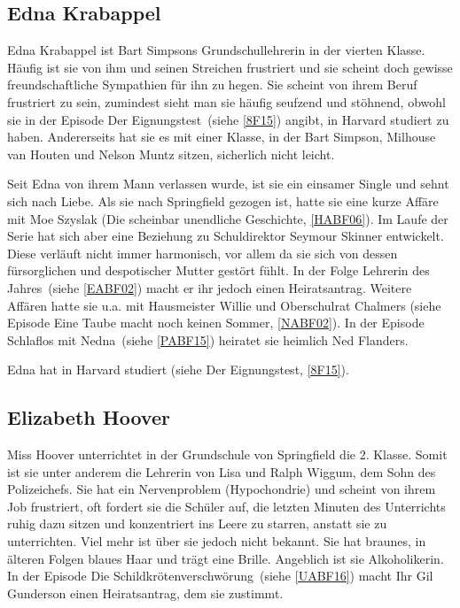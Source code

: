 \subsection{Edna Krabappel}\label{Krabappel}
Edna Krabappel ist Bart Simpsons Grundschullehrerin in der vierten Klasse. Häufig ist sie von ihm und seinen Streichen frustriert und sie scheint doch gewisse freundschaftliche Sympathien für ihn zu hegen. Sie scheint von ihrem Beruf frustriert zu sein, zumindest sieht man sie häufig seufzend und stöhnend, obwohl sie in der Episode \glqq Der Eignungstest\grqq\ (siehe \ref{8F15}) angibt, in Harvard studiert zu haben. Andererseits hat sie es mit einer Klasse, in der Bart Simpson, Milhouse van Houten und Nelson Muntz sitzen, sicherlich nicht leicht.

Seit Edna von ihrem Mann verlassen wurde, ist sie ein einsamer Single und sehnt sich nach Liebe. Als sie nach Springfield gezogen ist, hatte sie eine kurze Affäre mit Moe Szyslak (\glqq Die scheinbar unendliche Geschichte\grqq , \ref{HABF06}). Im Laufe der Serie hat sich aber eine Beziehung zu Schuldirektor Seymour Skinner entwickelt. Diese verläuft nicht immer harmonisch, vor allem da sie sich von dessen fürsorglichen und despotischer Mutter gestört fühlt. In der Folge \glqq Lehrerin des Jahres\grqq\ (siehe \ref{EABF02}) macht er ihr jedoch einen Heiratsantrag. Weitere Affären hatte sie u.a. mit Hausmeister Willie und Oberschulrat Chalmers (siehe Episode \glqq Eine Taube macht noch keinen Sommer\grqq , \ref{NABF02}). In der Episode \glqq Schlaflos mit Nedna\grqq\ (siehe \ref{PABF15}) heiratet sie heimlich Ned Flanders.

Edna hat in Harvard studiert (siehe \glqq Der Eignungstest\grqq, \ref{8F15}).


\subsection{Elizabeth Hoover}\label{ElizabethHoover}
Miss Hoover unterrichtet in der Grundschule von Springfield die 2. Klasse. Somit ist sie unter anderem die Lehrerin von Lisa und Ralph Wiggum, dem Sohn des Polizeichefs. Sie hat ein Nervenproblem (Hypochondrie) und scheint von ihrem Job frustriert, oft fordert sie die Schüler auf, die letzten Minuten des Unterrichts ruhig dazu sitzen und konzentriert ins Leere zu starren, anstatt sie zu unterrichten. Viel mehr ist über sie jedoch nicht bekannt. Sie hat braunes, in älteren Folgen blaues Haar und trägt eine Brille. Angeblich ist sie Alkoholikerin. In der Episode \glqq Die Schildkrötenverschwörung\grqq\ (siehe \ref{UABF16}) macht Ihr Gil Gunderson einen Heiratsantrag, dem sie zustimmt.

